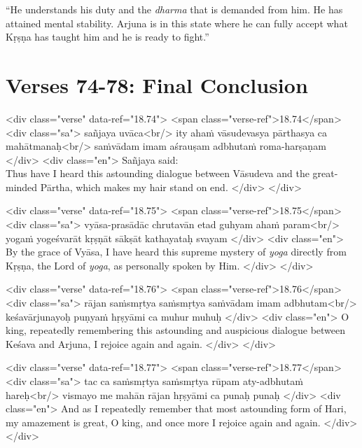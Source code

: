 \enquote{He understands his duty and the \textit{dharma} that is demanded from him. He has attained mental stability. Arjuna is in this state where he can fully accept what Kṛṣṇa has taught him and he is ready to fight.}

\section{Verses 74-78: Final Conclusion}\label{sec-verses-74-78-final-conclusion}


\begin{html}
<div class="verse" data-ref="18.74">
  <span class="verse-ref">18.74</span>
  <div class="sa">
    sañjaya uvāca<br/>
    ity ahaṁ vāsudevasya pārthasya ca mahātmanaḥ<br/>
    saṁvādam imam aśrauṣam adbhutaṁ roma-harṣaṇam
  </div>
  <div class="en">
    \hspace*{1em}Sañjaya said: \\ Thus have I heard this astounding dialogue between Vāsudeva and the great-minded Pārtha, which makes my hair stand on end.
  </div>
</div>
\end{html}



\begin{html}
<div class="verse" data-ref="18.75">
  <span class="verse-ref">18.75</span>
  <div class="sa">
    vyāsa-prasādāc chrutavān etad guhyam ahaṁ param<br/>
    yogaṁ yogeśvarāt kṛṣṇāt sākṣāt kathayataḥ svayam
  </div>
  <div class="en">
    By the grace of Vyāsa, I have heard this supreme mystery of \textit{yoga} directly from Kṛṣṇa, the Lord of \textit{yoga}, as personally spoken by Him.
  </div>
</div>
\end{html}



\begin{html}
<div class="verse" data-ref="18.76">
  <span class="verse-ref">18.76</span>
  <div class="sa">
    rājan saṁsmṛtya saṁsmṛtya saṁvādam imam adbhutam<br/>
    keśavārjunayoḥ puṇyaṁ hṛṣyāmi ca muhur muhuḥ
  </div>
  <div class="en">
    O king, repeatedly remembering this astounding and auspicious dialogue between Keśava and Arjuna, I rejoice again and again.
  </div>
</div>
\end{html}



\begin{html}
<div class="verse" data-ref="18.77">
  <span class="verse-ref">18.77</span>
  <div class="sa">
    tac ca saṁsmṛtya saṁsmṛtya rūpam aty-adbhutaṁ hareḥ<br/>
    vismayo me mahān rājan hṛṣyāmi ca punaḥ punaḥ
  </div>
  <div class="en">
    And as I repeatedly remember that most astounding form of Hari, my amazement is great, O king, and once more I rejoice again and again.
  </div>
</div>
\end{html}




